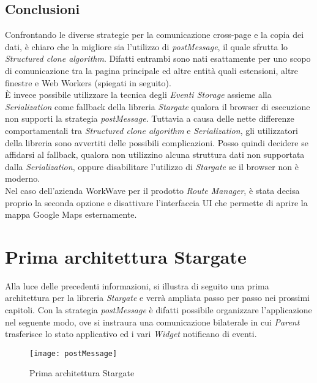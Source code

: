 \subsection{Conclusioni}

Confrontando le diverse strategie per la comunicazione cross-page e la copia dei dati, è chiaro che la migliore sia l'utilizzo di \textit{postMessage}, il quale sfrutta lo \textit{Structured clone algorithm}. Difatti entrambi sono nati esattamente per uno scopo di comunicazione tra la pagina principale ed altre entità quali estensioni, altre finestre e Web Workers (spiegati in seguito).\\

È invece possibile utilizzare la tecnica degli \textit{Eventi Storage} assieme alla \textit{Serialization} come fallback della libreria \textit{Stargate} qualora il browser di esecuzione non supporti la strategia \textit{postMessage}. Tuttavia a causa delle nette differenze comportamentali tra \textit{Structured clone algorithm} e \textit{Serialization}, gli utilizzatori della libreria sono avvertiti delle possibili complicazioni. Posso quindi decidere se affidarsi al fallback, qualora non utilizzino alcuna struttura dati non supportata dalla \textit{Serialization}, oppure disabilitare l'utilizzo di \textit{Stargate} se il browser non è moderno.\\

Nel caso dell'azienda WorkWave per il prodotto \textit{Route Manager}, è stata decisa proprio la seconda opzione e disattivare l'interfaccia UI che permette di aprire la mappa Google Maps esternamente.

\section{Prima architettura Stargate}

Alla luce delle precedenti informazioni, si illustra di seguito una prima architettura per la libreria \textit{Stargate} e verrà ampliata passo per passo nei prossimi capitoli. Con la strategia \textit{postMessage} è difatti possibile organizzare l'applicazione nel seguente modo, ove si instraura una comunicazione bilaterale in cui \textit{Parent} trasferisce lo stato applicativo ed i vari \textit{Widget} notificano di eventi. \\

\begin{figure}[H] 
  \centering 
  \texttt{[image: postMessage]} 
  \caption{Prima architettura Stargate}
\end{figure}

